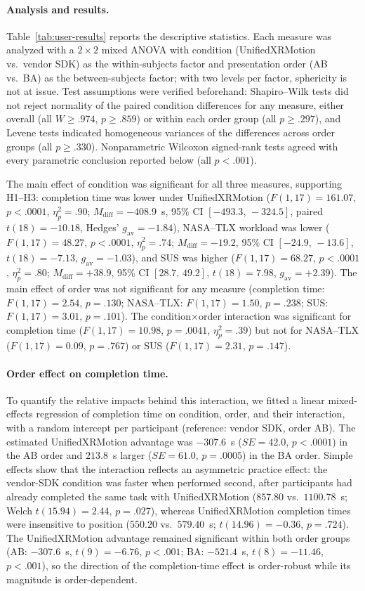 \documentclass[runningheads]{llncs}
\begin{document}
\paragraph{Analysis and results.}
Table~\ref{tab:user-results} reports the descriptive statistics.
Each measure was analyzed with a $2\times2$ mixed ANOVA with condition (UnifiedXRMotion vs.\ vendor SDK) as the within-subjects factor and presentation order (AB vs.\ BA) as the between-subjects factor; with two levels per factor, sphericity is not at issue.
Test assumptions were verified beforehand: Shapiro--Wilk tests did not reject normality of the paired condition differences for any measure, either overall (all $W\ge.974$, $p\ge.859$) or within each order group (all $p\ge.297$), and Levene tests indicated homogeneous variances of the differences across order groups (all $p\ge.330$).
Nonparametric Wilcoxon signed-rank tests agreed with every parametric conclusion reported below (all $p<.001$).

The main effect of condition was significant for all three measures, supporting H1--H3: completion time was lower under UnifiedXRMotion ($F(1,17)=161.07$, $p<.0001$, $\eta_p^2=.90$; $M_{\mathrm{diff}}=-408.9$~s, 95\% CI $[-493.3,\,-324.5]$, paired $t(18)=-10.18$, Hedges' $g_{\mathrm{av}}=-1.84$), NASA--TLX workload was lower ($F(1,17)=48.27$, $p<.0001$, $\eta_p^2=.74$; $M_{\mathrm{diff}}=-19.2$, 95\% CI $[-24.9,\,-13.6]$, $t(18)=-7.13$, $g_{\mathrm{av}}=-1.03$), and SUS was higher ($F(1,17)=68.27$, $p<.0001$, $\eta_p^2=.80$; $M_{\mathrm{diff}}=+38.9$, 95\% CI $[28.7,\,49.2]$, $t(18)=7.98$, $g_{\mathrm{av}}=+2.39$).
The main effect of order was not significant for any measure (completion time: $F(1,17)=2.54$, $p=.130$; NASA--TLX: $F(1,17)=1.50$, $p=.238$; SUS: $F(1,17)=3.01$, $p=.101$).
The condition$\times$order interaction was significant for completion time ($F(1,17)=10.98$, $p=.0041$, $\eta_p^2=.39$) but not for NASA--TLX ($F(1,17)=0.09$, $p=.767$) or SUS ($F(1,17)=2.31$, $p=.147$).

\paragraph{Order effect on completion time.}
To quantify the relative impacts behind this interaction, we fitted a linear mixed-effects regression of completion time on condition, order, and their interaction, with a random intercept per participant (reference: vendor SDK, order AB).
The estimated UnifiedXRMotion advantage was $-307.6$~s ($SE=42.0$, $p<.0001$) in the AB order and $213.8$~s larger ($SE=61.0$, $p=.0005$) in the BA order.
Simple effects show that the interaction reflects an asymmetric practice effect: the vendor-SDK condition was faster when performed second, after participants had already completed the same task with UnifiedXRMotion ($857.80$ vs.\ $1100.78$~s; Welch $t(15.94)=2.44$, $p=.027$), whereas UnifiedXRMotion completion times were insensitive to position ($550.20$ vs.\ $579.40$~s; $t(14.96)=-0.36$, $p=.724$).
The UnifiedXRMotion advantage remained significant within both order groups (AB: $-307.6$~s, $t(9)=-6.76$, $p<.001$; BA: $-521.4$~s, $t(8)=-11.46$, $p<.001$), so the direction of the completion-time effect is order-robust while its magnitude is order-dependent.
\end{document}
